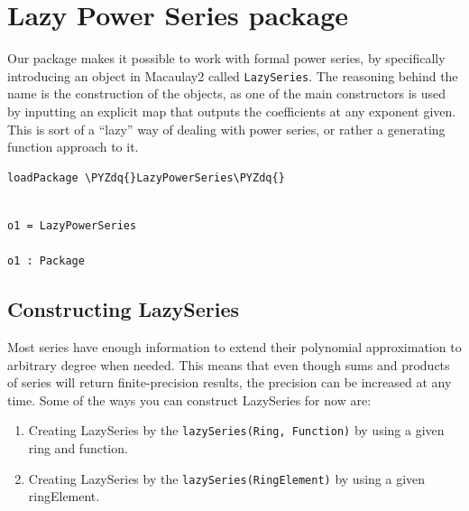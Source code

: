 \documentclass[11pt]{article}
\makeatletter
\providecommand{\tightlist}{%
      \setlength{\itemsep}{0pt}\setlength{\parskip}{0pt}}
\def\PYZdq{\char`\"}
\newcommand{\boxspacing}{\kern\kvtcb@left@rule\kern\kvtcb@boxsep}
\newcommand{\prompt}[4]{
        {\ttfamily\llap{{\color{#2}[#3]:\hspace{3pt}#4}}\vspace{-\baselineskip}}
    }
\makeatother
\begin{document}
    \hypertarget{lazy-power-series-package}{%
\section{Lazy Power Series package}\label{lazy-power-series-package}}

Our package makes it possible to work with formal power series, by
specifically introducing an object in Macaulay2 called
\texttt{LazySeries}. The reasoning behind the name is the construction
of the objects, as one of the main constructors is used by inputting an
explicit map that outputs the coefficients at any exponent given. This
is sort of a ``lazy'' way of dealing with power series, or rather a
generating function approach to it.

    \begin{tcolorbox}[breakable, size=fbox, boxrule=1pt, pad at break*=1mm,colback=cellbackground, colframe=cellborder]
\prompt{In}{incolor}{1}{\boxspacing}
\begin{Verbatim}[commandchars=\\\{\}]
loadPackage \PYZdq{}LazyPowerSeries\PYZdq{}
\end{Verbatim}
\end{tcolorbox}

    \begin{Verbatim}[commandchars=\\\{\}]

o1 = LazyPowerSeries

o1 : Package
    \end{Verbatim}

    \hypertarget{constructing-lazyseries}{%
\subsection{Constructing LazySeries}\label{constructing-lazyseries}}

Most series have enough information to extend their polynomial
approximation to arbitrary degree when needed. This means that even
though sums and products of series will return finite-precision results,
the precision can be increased at any time. Some of the ways you can
construct LazySeries for now are:

\begin{enumerate}
\def\labelenumi{\arabic{enumi}.}
\tightlist
\item
  Creating LazySeries by the \texttt{lazySeries(Ring,\ Function)} by
  using a given ring and function.
\item
  Creating LazySeries by the \texttt{lazySeries(RingElement)} by using a
  given ringElement.
\end{enumerate}
\end{document}
